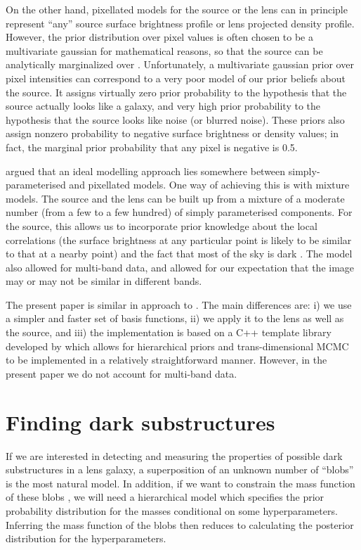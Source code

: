 \documentclass[useAMS,usenatbib]{mn2e}
\begin{document}
On the
other hand, pixellated models for the source \citep[e.g.][]{suyu} or the lens
\citep[e.g.][]{2014MNRAS.445.2181C} can in principle represent ``any''
source surface brightness profile or lens projected density profile. However, the prior
distribution over pixel values is often chosen to be a multivariate gaussian
for mathematical reasons, so
that the source can be analytically marginalized over
\citep{2003ApJ...590..673W}. Unfortunately, a multivariate gaussian prior
over pixel intensities can correspond to a very poor model of our prior
beliefs about the source. It assigns virtually zero prior probability
to the hypothesis that the source actually looks like a galaxy, and very high
prior probability to the hypothesis that the source looks like noise (or
blurred noise). These priors also assign nonzero probability to negative
surface brightness or density values; in fact, the marginal prior probability
that any pixel is negative is 0.5.

\citet{2011MNRAS.412.2521B} argued that an ideal
modelling approach lies somewhere between simply-parameterised and
pixellated models. One way of achieving this is with mixture models.
The source and the lens can be built up from a mixture of a moderate
number (from a few to a few hundred) of
simply parameterised components. For the source, this allows
us to incorporate prior knowledge about the local correlations (the surface
brightness at any particular point is likely to be similar to that at a
nearby point) and the fact that most of the sky is
dark \citep{2006ApJ...637..608B}. The \citet{2011MNRAS.412.2521B} model also
allowed for multi-band data, and allowed for our expectation that the image
may or may not be similar in different bands.

The present paper is similar in approach to \citet{2011MNRAS.412.2521B}.
The main differences are:
i) we use a simpler and faster set of basis functions,
ii) we apply it to the lens as well as the source, and
iii) the implementation is based on a C++ template library developed by
\citet{rjobject} which allows for hierarchical priors and trans-dimensional
MCMC to be implemented in a relatively straightforward manner.
However, in the present paper we do not account for
multi-band data.

\section{Finding dark substructures}
If we are interested in detecting and measuring the properties of
possible dark substructures in a lens galaxy,
a superposition of an unknown number of ``blobs'' is the
most natural model. In addition, if we want to constrain the mass function of
these blobs \citep[e.g.][]{2009MNRAS.400.1583V, 2014MNRAS.442.2017V},
we will need a hierarchical model which specifies the prior probability
distribution for the masses conditional on some hyperparameters. Inferring the
mass function of the blobs then reduces to calculating the posterior
distribution for the hyperparameters.
\end{document}

